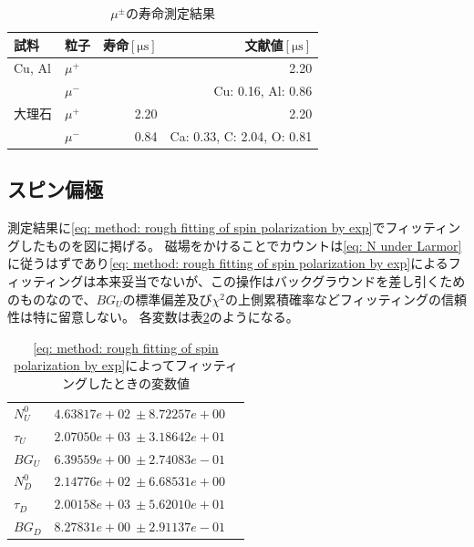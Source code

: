 \documentclass[dvipdfmx]{jsarticle}
\begin{document}
\begin{table}
    \centering
    \caption{$\mu^\pm$の寿命測定結果}
    \begin{tabular}{llrr}
        \toprule
        試料 & 粒子 & 寿命$[\unit{\micro\second}]$ & 文献値$[\unit{\micro\second}]$
        \\
        \midrule
        Cu, Al & $\mu^+$ & & 2.20
        \\
         & $\mu^-$ & & Cu: 0.16, Al: 0.86
        \\
        大理石 & $\mu^+$ & 2.20 & 2.20
        \\
         & $\mu^-$ & 0.84 & Ca: 0.33, C: 2.04, O: 0.81
        \\
        \bottomrule
    \end{tabular}
    \label{table: result: life}
\end{table}


\subsection{スピン偏極}

測定結果に\eqref{eq: method: rough fitting of spin polarization by exp}でフィッティングしたものを図に掲げる。
磁場をかけることでカウントは\eqref{eq: N under Larmor}に従うはずであり\eqref{eq: method: rough fitting of spin polarization by exp}によるフィッティングは本来妥当でないが、この操作はバックグラウンドを差し引くためのものなので、$BG_U$の標準偏差及び$\chi^2$の上側累積確率などフィッティングの信頼性は特に留意しない。
各変数は表\ref{table: result: parameters of result with B fit with exp}のようになる。

\begin{table}
    \centering
    \caption{\eqref{eq: method: rough fitting of spin polarization by exp}によってフィッティングしたときの変数値}
    \begin{tabular}[]{lrr}
        \toprule
        $N_U^0$ & $4.63817e+02\:\pm8.72257e+00$
        \\
        $\tau_U$ & $2.07050e+03\:\pm3.18642e+01$
        \\
        $BG_U$ & $6.39559e+00\:\pm2.74083e-01$
        \\
        \midrule
        $N_D^0$ & $2.14776e+02\:\pm6.68531e+00$
        \\
        $\tau_D$ & $2.00158e+03\:\pm5.62010e+01$
        \\
        $BG_D$ & $8.27831e+00\:\pm2.91137e-01$
        \\
        \bottomrule
    \end{tabular}
    \label{table: result: parameters of result with B fit with exp}
\end{table}
\end{document}
